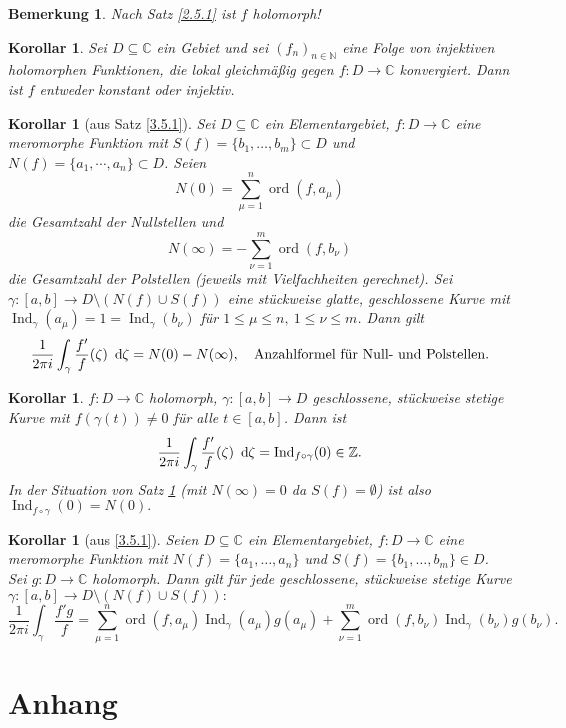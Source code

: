 \documentclass[a4paper,12pt]{article}
\theoremstyle{newthm}
\newtheorem{cor}[thm]{Korollar}
\theoremstyle{newdef}
\theoremstyle{newrem}
\newtheorem*{rem}{Bemerkung}
\newcommand{\N}{\mathbb{N}}
\newcommand{\Z}{\mathbb{Z}}
\newcommand{\C}{\mathbb{C}}
\renewcommand{\d}{\ \operatorname{d}\hspace{-2px}}
\newcommand{\ord}[2]{\operatorname{ord} \left( #1,#2 \right)}
\newcommand{\Ind}[1]{\operatorname{Ind}_{#1}}
\begin{document}
		\begin{rem}
			Nach Satz \ref{2.5.1} ist $f$ holomorph!
		\end{rem}
		
		\begin{cor}
			Sei $ D \subseteq \C $ ein Gebiet und sei $ (f_n)_{n \in \N} $ eine Folge von injektiven holomorphen Funktionen, die lokal gleichmäßig gegen $f: D \to \C$ konvergiert. Dann ist $f$ entweder konstant oder injektiv.
		\end{cor}
		
		\begin{cor}[aus Satz \ref{3.5.1}]\label{3.5.4}
			Sei $ D \subseteq \C $ ein Elementargebiet, $f: D \to \C$ eine meromorphe Funktion mit $ S(f) = \{b_1,\dotsc,b_m\} \subset D $ und $ N(f) = \{a_1,\dotsm,a_n\} \subset D $.	Seien 
			$$ N(0) = \sum_{\mu=1}^n \ord{f}{a_\mu} $$
			 die Gesamtzahl der Nullstellen und 
			 $$ N(\infty) = -\sum_{\nu=1}^m \ord{f}{b_\nu} $$
			 die Gesamtzahl der Polstellen (jeweils mit Vielfachheiten gerechnet). Sei $ \gamma: [a,b] \to D\setminus(N(f) \cup S(f)) $ eine stückweise glatte, geschlossene Kurve mit $ \Ind{\gamma}(a_\mu) = 1 = \Ind{\gamma}(b_\nu) $ für $ 1 \leq \mu \leq n,\ 1 \leq \nu \leq  m$. Dann gilt
			\[ \frac{1}{2\pi i} \int_\gamma \frac{f'}{f}(\zeta) \d\zeta = N(0) - N(\infty), \quad \text{Anzahlformel für Null- und Polstellen.} \]
		\end{cor}
		
		\begin{cor}
			$ f: D \to \C $ holomorph, $ \gamma: [a,b] \to D $ geschlossene, stückweise stetige Kurve mit $ f(\gamma(t)) \neq 0 $ für alle $ t \in [a,b] $. Dann ist 
			\[ \frac{1}{2\pi i} \int_\gamma \frac{f'}{f} (\zeta)\d\zeta = \Ind{f \circ \gamma}(0) \in \Z. \]
			In der Situation von Satz \ref{3.5.4} (mit $N(\infty) = 0$ da $S(f) = \emptyset$) ist also $ \Ind{f \circ \gamma}(0) = N(0). $ 
		\end{cor}
		
		\begin{cor}[aus \ref{3.5.1}]
			Seien $D \subseteq \C$ ein Elementargebiet, $ f: D \to \C $ eine meromorphe Funktion mit $ N(f) = \{a_1,\dotsc,a_n\} $ und $ S(f) = \{b_1,\dotsc,b_m\} \in D $.\\
			Sei $ g: D \to \C $ holomorph. Dann gilt für jede geschlossene, stückweise stetige Kurve $ \gamma: [a,b] \to D \setminus (N(f) \cup S(f)): $
			\[ \frac{1}{2\pi i} \int_\gamma \frac{f' g}{f} = \sum_{\mu=1}^n \ord{f}{a_\mu} \Ind{\gamma}(a_\mu)g(a_\mu) + \sum_{\nu=1}^m \ord{f}{b_\nu} \Ind{\gamma}(b_\nu)g(b_\nu). \]
		\end{cor}
		
		

	
	
	
	
	
	
\section*{Anhang}	
	
	\listoftheorems[ignoreall,show={defn}]
	
	
	
\end{document}
